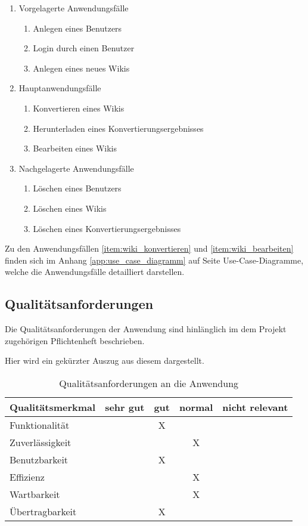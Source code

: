 \documentclass[12pt, xcolor=dvipsnames]{scrartcl}
\begin{document}
\begin{enumerate}
	\item Vorgelagerte Anwendungsfälle
	\begin{enumerate}
		\item Anlegen eines Benutzers		
		\item Login durch einen Benutzer
		\item Anlegen eines neues Wikis	
	\end{enumerate}
	\item Hauptanwendungsfälle
	\begin{enumerate}
		\item Konvertieren eines Wikis \label{item:wiki_konvertieren}
		\item Herunterladen eines Konvertierungsergebnisses
		\item Bearbeiten eines Wikis \label{item:wiki_bearbeiten}
	\end{enumerate}
	\item Nachgelagerte Anwendungsfälle
	\begin{enumerate}
		\item Löschen eines Benutzers
		\item Löschen eines Wikis
		\item Löschen eines Konvertierungsergebnisses
	\end{enumerate}
\end{enumerate}

Zu den Anwendungsfällen \ref{item:wiki_konvertieren} und \ref{item:wiki_bearbeiten} finden sich im Anhang \ref{app:use_case_diagramm} auf Seite \pageref{app:use_case_diagramm} Use-Case-Diagramme, welche die Anwendungsfälle detailliert darstellen.


\subsection{Qualitätsanforderungen}

Die Qualitätsanforderungen der Anwendung sind hinlänglich im dem Projekt zugehörigen Pflichtenheft beschrieben.

Hier wird ein gekürzter Auszug aus diesem dargestellt.

\begin{table}[H]
	\centering
	\begin{tabular}{lcccc}
	
	\rowcolor{white!15}
		\textbf{Qualitätsmerkmal} & \textbf{sehr gut} & \textbf{gut} & \textbf{normal} 
		& \textbf{nicht relevant}\\\hline
		

		Funktionalität 		&	& X	&	&	\\
		Zuverlässigkeit 	&	&	& X	&	\\
		Benutzbarkeit 		&	& X	&	&	\\
		Effizienz	 		&	&	& X	&	\\
		Wartbarkeit 		&	&	& X	&	\\
		Übertragbarkeit 	&	& X	&	&	\\
	\end{tabular}	
	
	\caption{Qualitätsanforderungen an die Anwendung}
	\label{tab:qualitätsanforderungen}
\end{table}
\end{document}
